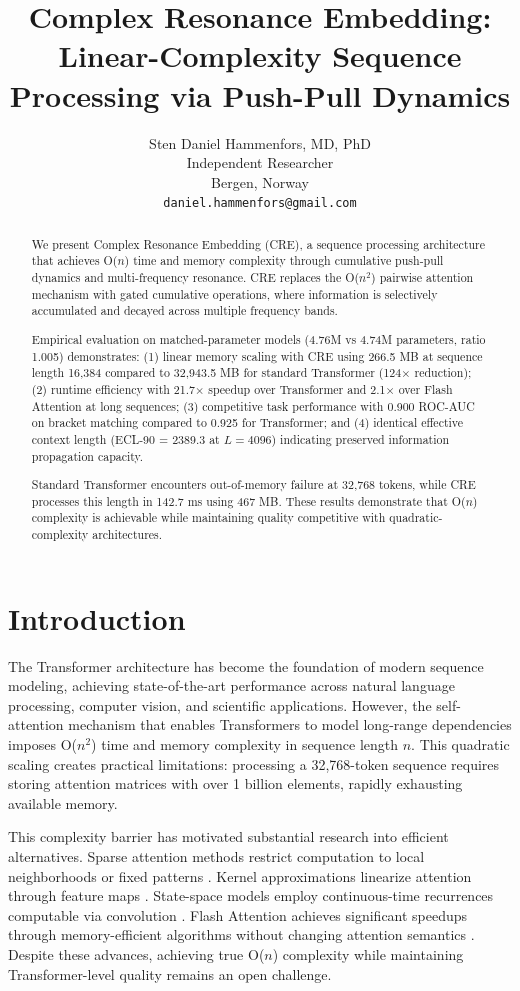 \documentclass{article}
\title{Complex Resonance Embedding: Linear-Complexity Sequence Processing via Push-Pull Dynamics}
\author{
Sten Daniel Hammenfors, MD, PhD\\
Independent Researcher\\
Bergen, Norway\\
\texttt{daniel.hammenfors@gmail.com}
}
\date{}
\begin{document}
\maketitle

\begin{abstract}
We present Complex Resonance Embedding (CRE), a sequence processing architecture that achieves O($n$) time and memory complexity through cumulative push-pull dynamics and multi-frequency resonance. CRE replaces the O($n^2$) pairwise attention mechanism with gated cumulative operations, where information is selectively accumulated and decayed across multiple frequency bands.

Empirical evaluation on matched-parameter models (4.76M vs 4.74M parameters, ratio 1.005) demonstrates: (1) linear memory scaling with CRE using 266.5 MB at sequence length 16,384 compared to 32,943.5 MB for standard Transformer (124$\times$ reduction); (2) runtime efficiency with 21.7$\times$ speedup over Transformer and 2.1$\times$ over Flash Attention at long sequences; (3) competitive task performance with 0.900 ROC-AUC on bracket matching compared to 0.925 for Transformer; and (4) identical effective context length (ECL-90 = 2389.3 at $L=4096$) indicating preserved information propagation capacity.

Standard Transformer encounters out-of-memory failure at 32,768 tokens, while CRE processes this length in 142.7 ms using 467 MB. These results demonstrate that O($n$) complexity is achievable while maintaining quality competitive with quadratic-complexity architectures.
\end{abstract}

\section{Introduction}

The Transformer architecture \citep{vaswani2017attention} has become the foundation of modern sequence modeling, achieving state-of-the-art performance across natural language processing, computer vision, and scientific applications. However, the self-attention mechanism that enables Transformers to model long-range dependencies imposes O($n^2$) time and memory complexity in sequence length $n$. This quadratic scaling creates practical limitations: processing a 32,768-token sequence requires storing attention matrices with over 1 billion elements, rapidly exhausting available memory.

This complexity barrier has motivated substantial research into efficient alternatives. Sparse attention methods restrict computation to local neighborhoods or fixed patterns \citep{beltagy2020longformer, zaheer2020bigbird}. Kernel approximations linearize attention through feature maps \citep{choromanski2021performer, katharopoulos2020transformers}. State-space models employ continuous-time recurrences computable via convolution \citep{gu2022efficiently, gu2023mamba}. Flash Attention achieves significant speedups through memory-efficient algorithms without changing attention semantics \citep{dao2022flashattention}. Despite these advances, achieving true O($n$) complexity while maintaining Transformer-level quality remains an open challenge.
\end{document}
